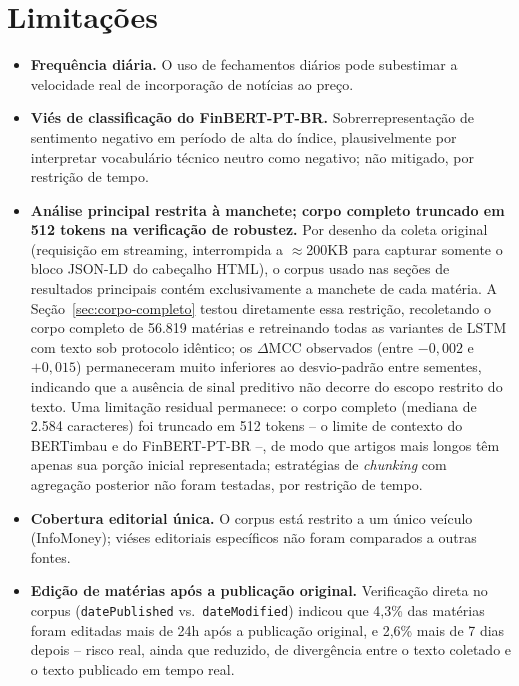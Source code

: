 \documentclass[conference]{IEEEtran}
\begin{document}
\section{Limita\c{c}\~oes}
\label{sec:limitacoes}

\begin{itemize}
\item \textbf{Frequ\^encia di\'aria.} O uso de fechamentos di\'arios pode subestimar a velocidade real de incorpora\c{c}\~ao de not\'icias ao pre\c{c}o.
\item \textbf{Vi\'es de classifica\c{c}\~ao do FinBERT-PT-BR.} Sobrerrepresenta\c{c}\~ao de sentimento negativo em per\'iodo de alta do \'indice, plausivelmente por interpretar vocabul\'ario t\'ecnico neutro como negativo; n\~ao mitigado, por restri\c{c}\~ao de tempo.
\item \textbf{An\'alise principal restrita \`a manchete; corpo completo truncado em 512 tokens na verifica\c{c}\~ao de robustez.} Por desenho da coleta original (requisi\c{c}\~ao em streaming, interrompida a $\approx$200KB para capturar somente o bloco JSON-LD do cabe\c{c}alho HTML), o corpus usado nas se\c{c}\~oes de resultados principais cont\'em exclusivamente a manchete de cada mat\'eria. A Se\c{c}\~ao~\ref{sec:corpo-completo} testou diretamente essa restri\c{c}\~ao, recoletando o corpo completo de 56.819 mat\'erias e retreinando todas as variantes de LSTM com texto sob protocolo id\^entico; os $\Delta$MCC observados (entre $-0{,}002$ e $+0{,}015$) permaneceram muito inferiores ao desvio-padr\~ao entre sementes, indicando que a aus\^encia de sinal preditivo n\~ao decorre do escopo restrito do texto. Uma limita\c{c}\~ao residual permanece: o corpo completo (mediana de 2.584 caracteres) foi truncado em 512 tokens -- o limite de contexto do BERTimbau e do FinBERT-PT-BR --, de modo que artigos mais longos t\^em apenas sua por\c{c}\~ao inicial representada; estrat\'egias de \emph{chunking} com agrega\c{c}\~ao posterior n\~ao foram testadas, por restri\c{c}\~ao de tempo.
\item \textbf{Cobertura editorial \'unica.} O corpus est\'a restrito a um \'unico ve\'iculo (InfoMoney); vi\'eses editoriais espec\'ificos n\~ao foram comparados a outras fontes.
\item \textbf{Edi\c{c}\~ao de mat\'erias ap\'os a publica\c{c}\~ao original.} Verifica\c{c}\~ao direta no corpus (\texttt{datePublished} vs.\ \texttt{dateModified}) indicou que 4,3\% das mat\'erias foram editadas mais de 24h ap\'os a publica\c{c}\~ao original, e 2,6\% mais de 7 dias depois -- risco real, ainda que reduzido, de diverg\^encia entre o texto coletado e o texto publicado em tempo real.

\end{itemize}
\end{document}
